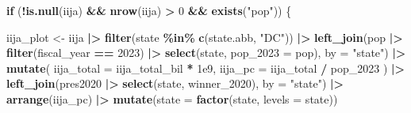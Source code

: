 \documentclass[
  11pt,
]{article}
\newenvironment{Shaded}{\begin{snugshade}}{\end{snugshade}}
\newcommand{\AttributeTok}[1]{\textcolor[rgb]{0.13,0.29,0.53}{#1}}
\newcommand{\ControlFlowTok}[1]{\textcolor[rgb]{0.13,0.29,0.53}{\textbf{#1}}}
\newcommand{\DecValTok}[1]{\textcolor[rgb]{0.00,0.00,0.81}{#1}}
\newcommand{\FloatTok}[1]{\textcolor[rgb]{0.00,0.00,0.81}{#1}}
\newcommand{\FunctionTok}[1]{\textcolor[rgb]{0.13,0.29,0.53}{\textbf{#1}}}
\newcommand{\NormalTok}[1]{#1}
\newcommand{\OtherTok}[1]{\textcolor[rgb]{0.56,0.35,0.01}{#1}}
\newcommand{\SpecialCharTok}[1]{\textcolor[rgb]{0.81,0.36,0.00}{\textbf{#1}}}
\newcommand{\StringTok}[1]{\textcolor[rgb]{0.31,0.60,0.02}{#1}}
\begin{document}
\begin{Shaded}
\begin{Highlighting}[]
\ControlFlowTok{if}\NormalTok{ (}\SpecialCharTok{!}\FunctionTok{is.null}\NormalTok{(iija) }\SpecialCharTok{\&\&} \FunctionTok{nrow}\NormalTok{(iija) }\SpecialCharTok{\textgreater{}} \DecValTok{0} \SpecialCharTok{\&\&} \FunctionTok{exists}\NormalTok{(}\StringTok{"pop"}\NormalTok{)) \{}

\NormalTok{  iija\_plot }\OtherTok{\textless{}{-}}\NormalTok{ iija }\SpecialCharTok{|\textgreater{}}
    \FunctionTok{filter}\NormalTok{(state }\SpecialCharTok{\%in\%} \FunctionTok{c}\NormalTok{(state.abb, }\StringTok{"DC"}\NormalTok{)) }\SpecialCharTok{|\textgreater{}}
    \FunctionTok{left\_join}\NormalTok{(pop }\SpecialCharTok{|\textgreater{}}
                \FunctionTok{filter}\NormalTok{(fiscal\_year }\SpecialCharTok{==} \DecValTok{2023}\NormalTok{) }\SpecialCharTok{|\textgreater{}}
                \FunctionTok{select}\NormalTok{(state, }\AttributeTok{pop\_2023 =}\NormalTok{ pop),}
              \AttributeTok{by =} \StringTok{"state"}\NormalTok{) }\SpecialCharTok{|\textgreater{}}
    \FunctionTok{mutate}\NormalTok{(}
      \AttributeTok{iija\_total =}\NormalTok{ iija\_total\_bil }\SpecialCharTok{*} \FloatTok{1e9}\NormalTok{,}
      \AttributeTok{iija\_pc =}\NormalTok{ iija\_total }\SpecialCharTok{/}\NormalTok{ pop\_2023}
\NormalTok{    ) }\SpecialCharTok{|\textgreater{}}
    \FunctionTok{left\_join}\NormalTok{(pres2020 }\SpecialCharTok{|\textgreater{}} \FunctionTok{select}\NormalTok{(state, winner\_2020), }\AttributeTok{by =} \StringTok{"state"}\NormalTok{) }\SpecialCharTok{|\textgreater{}}
    \FunctionTok{arrange}\NormalTok{(iija\_pc) }\SpecialCharTok{|\textgreater{}}
    \FunctionTok{mutate}\NormalTok{(}\AttributeTok{state =} \FunctionTok{factor}\NormalTok{(state, }\AttributeTok{levels =}\NormalTok{ state))}


\end{Highlighting}
\end{Shaded}
\end{document}
